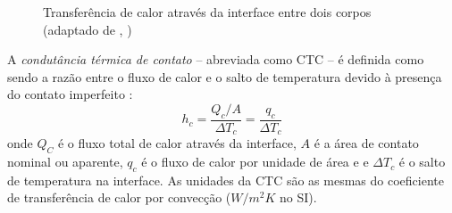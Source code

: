 \begin{figure}[h!b]
\begin{center}
\caption{Transferência de calor através da interface entre dois corpos (adaptado de \citeauthor{livro_ozisik}, \citeyear{livro_ozisik})}
\label{fig1}
\end{center}
\end{figure}

A \textit{condutância térmica de contato} -- abreviada como CTC -- é definida como sendo a razão entre o fluxo de calor e o salto de temperatura
devido à presença do contato imperfeito \citep{livro_madhusudana}:
\begin{equation}
	h_c = \frac{Q_c/A}{\Delta T_c} = \frac{q_c}{\Delta T_c} \label{eq:definicao_1}
\end{equation}
onde $Q_C$ é o fluxo total de calor através da interface, $A$ é a área de contato nominal ou aparente, $q_c$ é o fluxo de calor por unidade de área e e $\Delta T_c$ é o salto de temperatura na interface. As unidades
da CTC são as mesmas do coeficiente de transferência de calor por convecção ($W/m^2 K$ no SI).

